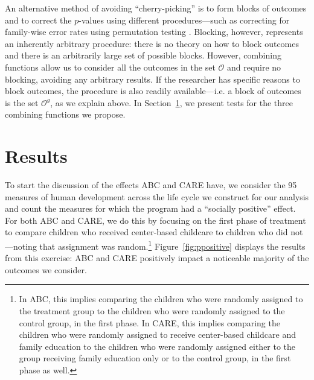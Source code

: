 \noindent An alternative method of avoiding ``cherry-picking'' is to form blocks of outcomes and to correct the $p$-values using different procedures---such as correcting for family-wise error rates using permutation testing \citep{Lehmann_Romano_2005_testing,Romano_Shaikh_2006_AnnStat,Heckman_Moon_etal_2010_QE}. Blocking, however, represents an inherently arbitrary procedure: there is no theory on how to block outcomes and there is an arbitrarily large set of possible blocks. However, combining functions allow us to consider all the outcomes in the set $\mathcal{O}$ and require no blocking, avoiding any arbitrary results. If the researcher has specific reasons to block outcomes, the procedure is also readily available---i.e. a block of outcomes is the set $\mathcal{O}^g$, as we explain above. In Section~\ref{section:results}, we present tests for the three combining functions we propose.

\section{Results} \label{section:results}

\noindent To start the discussion of the effects ABC and CARE have, we consider the 95 measures of human development across the life cycle we construct for our analysis and count the measures for which the program had a ``socially positive'' effect. For both ABC and CARE, we do this by focusing on the first phase of treatment to compare children who received center-based childcare to children who did not---noting that assignment was random.\footnote{In ABC, this implies comparing the children who were randomly assigned to the treatment group to the children who were randomly assigned to the control group, in the first phase. In CARE, this implies comparing the children who were randomly assigned to receive center-based childcare and family education to the children who were randomly assigned either to the group receiving family education only or to the control group, in the first phase as well.} Figure~\ref{fig:ppositive} displays the results from this exercise: ABC and CARE positively impact a noticeable majority of the outcomes we consider.

